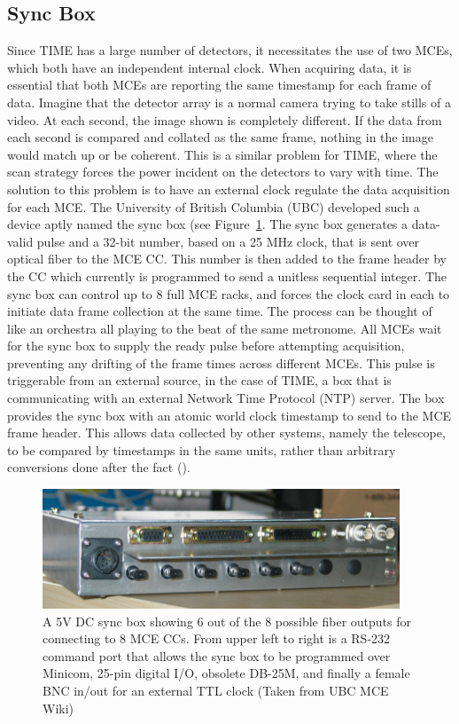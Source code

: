 \documentclass[manuscript]{aastex}
\begin{document}
\subsection{\textbf{Sync Box}}
Since TIME has a large number of detectors, it necessitates the use of two MCEs, which both have an independent internal clock. When acquiring data, it is essential that both MCEs are reporting the same timestamp for each frame of data. Imagine that the detector array is a normal camera trying to take stills of a video. At each second, the image shown is completely different. If the data from each second is compared and collated as the same frame, nothing in the image would match up or be coherent. This is a similar problem for TIME, where the scan strategy forces the power incident on the detectors to vary with time. The solution to this problem is to have an external clock regulate the data acquisition for each MCE. The University of British Columbia (UBC) developed such a device aptly named the sync box (see Figure~\ref{fig:syncbox}. The sync box generates a data-valid pulse and a 32-bit number, based on a 25 MHz clock, that is sent over optical fiber to the MCE CC. This number is then added to the frame header by the CC which currently is programmed to send a unitless sequential integer. The sync box can control up to 8 full MCE racks, and forces the clock card in each to initiate data frame collection at the same time. The process can be thought of like an orchestra all playing to the beat of the same metronome. All MCEs wait for the sync box to supply the ready pulse before attempting acquisition, preventing any drifting of the frame times across different MCEs. This pulse is triggerable from an external source, in the case of TIME, a box that is communicating with an external Network Time Protocol (NTP) server. The box provides the sync box with an atomic world clock timestamp to send to the MCE frame header. This allows data collected by other systems, namely the telescope, to be compared by timestamps in the same units, rather than arbitrary conversions done after the fact (\cite{Battistelli2008}).

\begin{figure}[H]
\centering
\captionsetup{width=0.95\textwidth}
\includegraphics[width=0.95\textwidth]{sync.png}
\caption[University of British Columbia Sync Box -(UBC MCE Wiki)]{A 5V DC sync box showing 6 out of the 8 possible fiber outputs for connecting to 8 MCE CCs. From upper left to right is a RS-232 command port that allows the sync box to be programmed over {\sc Minicom}, 25-pin digital I/O, obsolete DB-25M, and finally a female BNC in/out for an external TTL clock (Taken from UBC MCE Wiki)}
\label{fig:mce2}
\vspace{-0.8cm}
\label{fig:syncbox}
\end{figure}
\end{document}
